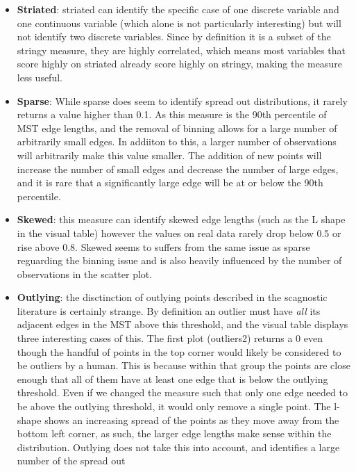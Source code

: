 \begin{itemize}
\item
  \textbf{Striated}: striated can identify the specific case of one
  discrete variable and one continuous variable (which alone is not
  particularly interesting) but will not identify two discrete
  variables. Since by definition it is a subset of the stringy measure,
  they are highly correlated, which means most variables that score
  highly on striated already score highly on stringy, making the measure
  less useful.
\item
  \textbf{Sparse}: While sparse does seem to identify spread out
  distributions, it rarely returns a value higher than 0.1. As this
  measure is the 90th percentile of MST edge lengths, and the removal of
  binning allows for a large number of arbitrarily small edges. In
  addiiton to this, a larger number of observations will arbitrarily
  make this value smaller. The addition of new points will increase the
  number of small edges and decrease the number of large edges, and it
  is rare that a significantly large edge will be at or below the 90th
  percentile.\\
\item
  \textbf{Skewed}: this measure can identify skewed edge lengths (such
  as the L shape in the visual table) however the values on real data
  rarely drop below 0.5 or rise above 0.8. Skewed seems to suffers from
  the same issue as sparse reguarding the binning issue and is also
  heavily influenced by the number of observations in the scatter plot.
\item
  \textbf{Outlying}: the disctinction of outlying points described in
  the scagnostic literature is certainly strange. By definition an
  outlier must have \emph{all} its adjacent edges in the MST above this
  threshold, and the visual table displays three interesting cases of
  this. The first plot (outliers2) returns a 0 even though the handful
  of points in the top corner would likely be considered to be outliers
  by a human. This is because within that group the points are close
  enough that all of them have at least one edge that is below the
  outlying threshold. Even if we changed the measure such that only one
  edge needed to be above the outlying threshold, it would only remove a
  single point. The l-shape shows an increasing spread of the points as
  they move away from the bottom left corner, as such, the larger edge
  lengths make sense within the distribution. Outlying does not take
  this into account, and identifies a large number of the spread out

\end{itemize}

